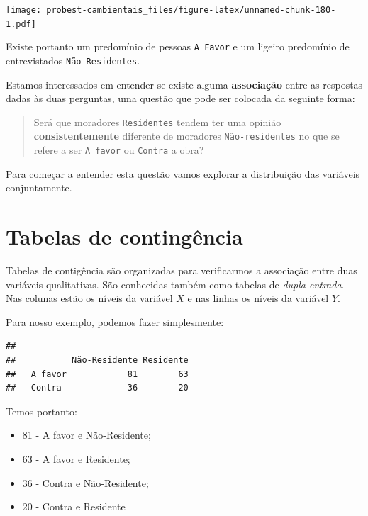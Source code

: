 \documentclass[
]{book}
\newenvironment{Shaded}{\begin{snugshade}}{\end{snugshade}}
\newcommand{\FunctionTok}[1]{\textcolor[rgb]{0.00,0.00,0.00}{#1}}
\newcommand{\NormalTok}[1]{#1}
\newcommand{\OtherTok}[1]{\textcolor[rgb]{0.56,0.35,0.01}{#1}}
\newcommand{\SpecialCharTok}[1]{\textcolor[rgb]{0.00,0.00,0.00}{#1}}
\begin{document}
\texttt{[image: probest-cambientais\_files/figure-latex/unnamed-chunk-180-1.pdf]}

Existe portanto um predomínio de pessoas \texttt{A\ Favor} e um ligeiro predomínio de entrevistados \texttt{Não-Residentes}.

Estamos interessados em entender se existe alguma \textbf{associação} entre as respostas dadas às duas perguntas, uma questão que pode ser colocada da seguinte forma:

\begin{quote}
Será que moradores \texttt{Residentes} tendem ter uma opinião \textbf{consistentemente} diferente de moradores \texttt{Não-residentes} no que se refere a ser \texttt{A\ favor} ou \texttt{Contra} a obra?
\end{quote}

Para começar a entender esta questão vamos explorar a distribuição das variáveis conjuntamente.

\hypertarget{tabelas-de-continguxeancia}{%
\section{Tabelas de contingência}\label{tabelas-de-continguxeancia}}

Tabelas de contigência são organizadas para verificarmos a associação entre duas variáveis qualitativas. São conhecidas também como tabelas de \emph{dupla entrada}. Nas colunas estão os níveis da variável \(X\) e nas linhas os níveis da variável \(Y\).

Para nosso exemplo, podemos fazer simplesmente:

\begin{Shaded}
\end{Shaded}

\begin{verbatim}
##          
##           Não-Residente Residente
##   A favor            81        63
##   Contra             36        20
\end{verbatim}

Temos portanto:

\begin{itemize}
\item
  81 - A favor e Não-Residente;
\item
  63 - A favor e Residente;
\item
  36 - Contra e Não-Residente;
\item
  20 - Contra e Residente
\end{itemize}
\end{document}

